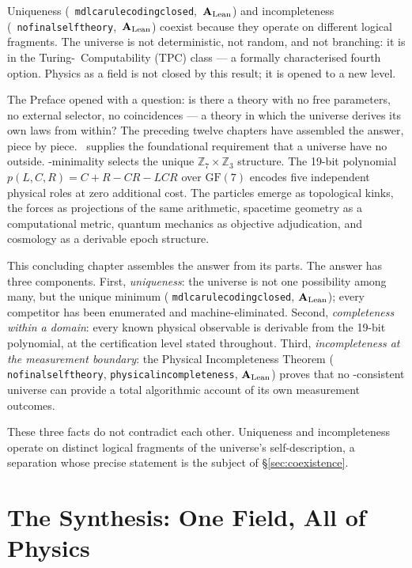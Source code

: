 \documentclass[11pt,openany]{book}
\theoremstyle{remark}
\newcommand{\MDL}{\text{MDL}}
\newcommand{\PSC}{\text{PSC}}
\newcommand{\ZS}{\mathbb{Z}_7}
\newcommand{\lean}[1]{%
  \penalty-100
  \begingroup\def\_{\textunderscore\allowbreak}\texttt{#1}\endgroup}
\newcommand{\CatAL}{\ensuremath{\textbf{A}_{\rm Lean}}}
\begin{document}
\begin{tcolorbox}[colback=blue!5,colframe=blue!50!black,title={Chapter~13 Claim}]
Uniqueness \mbox{(\lean{mdl\_ca\_rule\_coding\_closed}, \CatAL)} and incompleteness \mbox{(\lean{no\_final\_self\_theory}, \CatAL)} coexist because they operate on different
logical fragments. The universe is not deterministic, not random, and not branching:
it is in the Turing-\PSC\ Computability (TPC) class --- a formally characterised
fourth option. Physics as a field is not closed by this result; it is opened to a
new level.
\end{tcolorbox}

The Preface opened with a question: is there a theory with no free parameters, no
external selector, no coincidences --- a theory in which the universe derives its own
laws from within? The preceding twelve chapters have assembled the answer, piece by
piece. \PSC\ supplies the foundational requirement that a universe have no outside.
\MDL-minimality selects the unique $\ZS \times \mathbb{Z}_3$ structure. The 19-bit
polynomial $p(L,C,R) = C{+}R{-}CR{-}LCR$ over $\mathrm{GF}(7)$ encodes five independent
physical roles at zero additional cost. The particles emerge as topological kinks, the
forces as projections of the same arithmetic, spacetime geometry as a computational
metric, quantum mechanics as objective adjudication, and cosmology as a derivable
epoch structure.

This concluding chapter assembles the answer from its parts. The answer has three
components. First, \emph{uniqueness}: the universe is not one possibility among many,
but the unique minimum (\lean{mdl\_ca\_rule\_coding\_closed}, \CatAL); every competitor
has been enumerated and machine-eliminated. Second, \emph{completeness within a domain}:
every known physical observable is derivable from the 19-bit polynomial, at the
certification level stated throughout. Third, \emph{incompleteness at the measurement
boundary}: the Physical Incompleteness Theorem (\lean{no\_final\_self\_theory},
\lean{physical\_incompleteness}, \CatAL) proves that no \PSC-consistent universe can
provide a total algorithmic account of its own measurement outcomes.

These three facts do not contradict each other. Uniqueness and incompleteness operate
on distinct logical fragments of the universe's self-description, a separation whose
precise statement is the subject of \S\ref{sec:coexistence}.

\section{The Synthesis: One Field, All of Physics}
\label{sec:synthesis}
\end{document}
